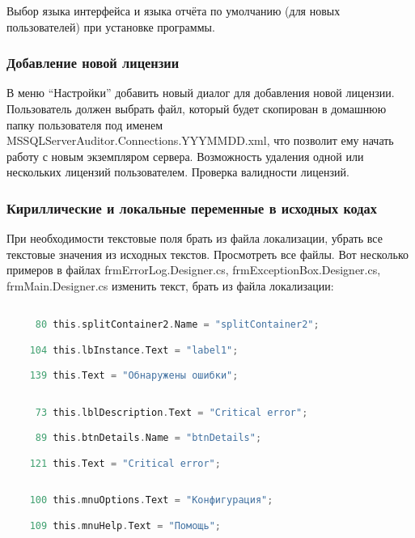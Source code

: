 \bigskip

Выбор языка интерфейса и языка отчёта по умолчанию (для новых пользователей) при установке
программы.

\subsubsection{Добавление новой лицензии}

В меню ``Настройки'' добавить новый диалог для добавления новой лицензии. Пользователь должен
выбрать файл, который будет скопирован в домашнюю папку пользователя под именем
MSSQL\-Server\-Auditor.Connec\-tions.YYYMMDD.xml, что позволит ему начать работу с новым экземпляром
сервера. Возможность удаления одной или нескольких лицензий пользователем. Проверка валидности
лицензий.

\subsubsection{Кириллические и локальные переменные в исходных кодах}

При необходимости текстовые поля брать из файла локализации, убрать все текстовые значения из
исходных текстов. Просмотреть все файлы. Вот несколько примеров в файлах frmErrorLog.Designer.cs,
frmExceptionBox.Designer.cs, frmMain.Designer.cs изменить текст, брать из файла локализации:

\begin{lstlisting}[language=C,label=Labels:frmErrorLog.Designer.cs,caption=frmErrorLog.Designer.cs]

	 80 this.splitContainer2.Name = "splitContainer2";

	104 this.lbInstance.Text = "label1";

	139 this.Text = "Обнаружены ошибки";

\end{lstlisting}

\begin{lstlisting}[language=C,label=Labels:frmExceptionBox.Designer.cs,caption=frmExceptionBox.Designer.cs]

	 73 this.lblDescription.Text = "Critical error";

	 89 this.btnDetails.Name = "btnDetails";

	121 this.Text = "Critical error";

\end{lstlisting}

\begin{lstlisting}[language=C,label=Labels:frmMain.Designer.cs,caption=frmMain.Designer.cs]

	100 this.mnuOptions.Text = "Конфигурация";

	109 this.mnuHelp.Text = "Помощь";

\end{lstlisting}

